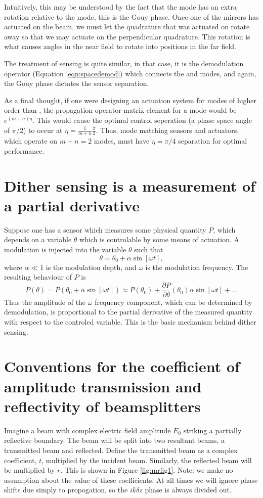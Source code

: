 Intuitively, this may be understood by the fact that the  mode has an extra rotation relative to the  mode, this is the Gouy phase. %
Once one of the mirrors has actuated on the beam, we must let the quadrature that was actuated on rotate away so that we may actuate on the perpendicular quadrature. %
This rotation is what causes angles in the near field to rotate into positions in the far field. %


The treatment of sensing is quite similar, in that case, it is the demodulation operator (Equation \ref{eqn:spacedemod}) which connects the  and  modes, and again, the Gouy phase dictates the sensor separation.

As a final thought, if one were designing an actuation system for modes of higher order than , the propagation operator matrix element for a  mode would be $e^{(m+n)\eta}$. %
This would cause the optimal control seperation (a phase space angle of $\pi/2$) to occur at $\eta=\frac{1}{m+n}\frac{\pi}{2}$. %
Thus, mode matching sensors and actuators, which operate on $m+n=2$ modes, must have  $\eta=\pi/4$ separation for optimal performance.

\section{Dither sensing is a measurement of a partial derivative}
\label{sec:dithersens}
Suppose one has a sensor which measures some physical quantity $P$, which depends on a variable $\theta$ which is controlable by some means of actuation. %
A modulation is injected into the variable $\theta$ such that
\begin{equation}
\theta = \theta_0+\alpha \sin[\omega t],
\end{equation}
where $\alpha \ll 1$ is the modulation depth, and $\omega$ is the modulation frequency. %
The resulting behaviour of $P$ is
\begin{equation}
P(\theta)=P(\theta_0+\alpha \sin[\omega t])\approx P(\theta_0)+\frac{\partial P}{\partial \theta}(\theta_0)\alpha \sin[\omega t] + \ldots
\end{equation}
Thus the amplitude of the $\omega$ frequency component, which can be determined by demodulation, is proportional to the partial derivative of the measured quantity with respect to the controled variable. %
This is the basic mechanism behind dither sensing.
\section{Conventions for the coefficient of amplitude transmission and reflectivity of beamsplitters}
Imagine a beam with complex electric field amplitude $E_0$ striking a partially reflective boundary. %
The beam will be split into two resultant beams, a transmitted beam and reflected. %
Define the transmitted beam as a complex coefficient, $t$, multiplied by the incident beam. %
Similarly, the reflected beam will be multiplied by $r$. %
This is shown in Figure \ref{fig:mrfig1}. %
Note: we make no assumption about the value of these coefficients. %
At all times we will ignore phase shifts due simply to propogation, so the $ik\delta z$ phase is always divided out.

